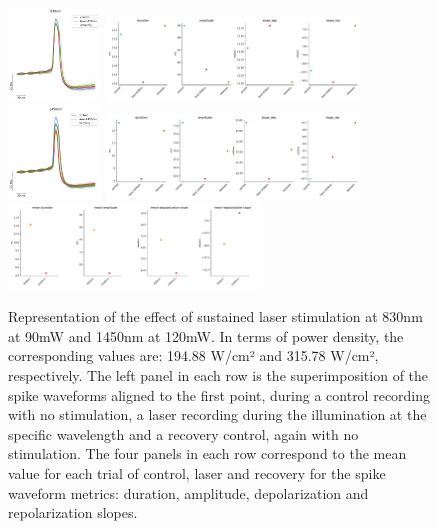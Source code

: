 \begin{figure}[hbt!]
	\centering
	\includegraphics[width=0.22\textwidth]{img/laser/wavelength/830nm.png}
	\includegraphics[width=0.6\textwidth]{img/laser/wavelength/830nmmetrics.pdf}
	\centering
	\includegraphics[width=0.22\textwidth]{img/laser/wavelength/1450nm.png}
	\includegraphics[width=0.6\textwidth]{img/laser/wavelength/1450nmmetrics.pdf}
	\centering
	\includegraphics[width=0.6\textwidth]{img/laser/wavelength/allmetrics.pdf}
	\caption{Representation of the effect of sustained laser stimulation at 830nm at 90mW and 1450nm at 120mW. In terms of power density, the corresponding values are: 194.88 W/cm² and 315.78 W/cm², respectively. The left panel in each row is the superimposition of the spike waveforms aligned to the first point, during a control recording with no stimulation, a laser recording during the illumination at the specific wavelength and a recovery control, again with no stimulation. The four panels in each row correspond to the mean value for each trial of control, laser and recovery for the spike waveform metrics: duration, amplitude, depolarization and repolarization slopes.}
    \label{fig:wavelengths results}
\end{figure}

